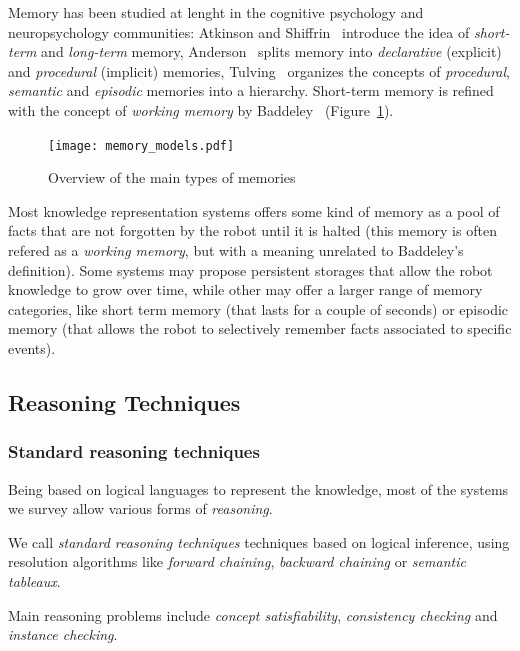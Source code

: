 \documentclass[a4paper, twocolumn]{article}
\begin{document}
Memory has been studied at lenght in the cognitive psychology and
neuropsychology communities: Atkinson and Shiffrin~\cite{Atkinson1968}
introduce the idea of \emph{short-term} and \emph{long-term} memory,
Anderson~\cite{Anderson1976} splits memory into \emph{declarative} (explicit)
and \emph{procedural} (implicit) memories, Tulving~\cite{Tulving1985} organizes
the concepts of \emph{procedural}, \emph{semantic} and \emph{episodic} memories
into a hierarchy. Short-term memory is refined with the concept of
\emph{working memory} by Baddeley~\cite{Baddeley2010}
(Figure~\ref{fig|memory_models}).

\begin{figure}
    \centering
    \texttt{[image: memory\_models.pdf]}
    \caption{Overview of the main types of memories}
    \label{fig|memory_models}
\end{figure}

Most knowledge representation systems offers some kind of memory as a pool of
facts that are not forgotten by the robot until it is halted (this memory is
often refered as a \emph{working memory}, but with a meaning unrelated to
Baddeley's definition). Some systems may propose persistent storages that allow
the robot knowledge to grow over time, while other may offer a larger range of
memory categories, like short term memory (that lasts for a couple of seconds)
or episodic memory (that allows the robot to selectively remember facts
associated to specific events).


\subsection{Reasoning Techniques}
\label{sect|reasoning}

\subsubsection{Standard reasoning techniques}

Being based on logical languages to represent the knowledge, most of the
systems we survey allow various forms of \emph{reasoning}.

We call \emph{standard reasoning techniques} techniques based on logical
inference, using resolution algorithms like \emph{forward chaining},
\emph{backward chaining} or \emph{semantic tableaux}.

Main reasoning problems include \emph{concept satisfiability},
\emph{consistency checking} and \emph{instance checking}.
\end{document}
